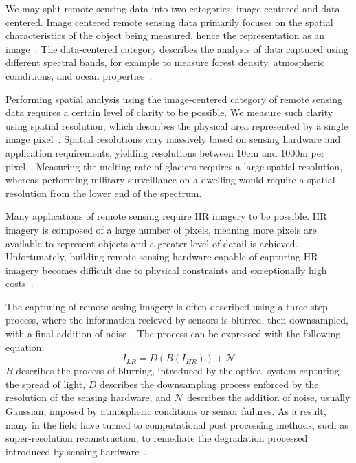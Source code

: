 We may split remote sensing data into two categories: image-centered and data-centered. Image centered remote sensing data primarily focuses on the spatial characteristics of the object being measured, hence the representation as an image~\cite{remoteSensingImageProcessing}. The data-centered category describes the analysis of data captured using different spectral bands, for example to measure forest density, atmospheric coniditions, and ocean properties~\cite{remoteSensingImageProcessing}.

Performing spatial analysis using the image-centered category of remote sensing data requires a certain level of clarity to be possible. We measure such clarity using spatial resolution, which describes the physical area represented by a single image pixel~\cite{ref}. Spatial resolutions vary massively based on sensing hardware and application requirements, yielding resolutions between 10cm and 1000m per pixel~\cite{remoteSensing,remoteSensingImageProcessing}. Measuring the melting rate of glaciers requires a large spatial resolution, whereas performing military surveillance on a dwelling would require a spatial resolution from the lower end of the spectrum.

Many applications of remote sensing require HR imagery to be possible. HR imagery is composed of a large number of pixels, meaning more pixels are available to represent objects and a greater level of detail is achieved. Unfortunately, building remote sensing hardware capable of capturing HR imagery becomes difficult due to physical constraints and exceptionally high costs~\cite{ref}. 

The capturing of remote sesing imagery is often described using a three step process, where the information recieved by sensors is blurred, then downsampled, with a final addition of noise~\cite{superResRemoteSensingOverview, superResRemoteSensingChallenges, remoteSensingDeepLearningReview, remoteSensingGANsReview}. The process can be expressed with the following equation:
\[I_{LR} = D(B(I_{HR})) + \mathcal{N}\]
$B$ describes the process of blurring, introduced by the optical system capturing the spread of light, $D$ describes the downsampling process enforced by the resolution of the sensing hardware, and $\mathcal{N}$ describes the addition of noise, usually Gaussian, imposed by atmospheric conditions or sensor failures. As a result, many in the field have turned to computational post processing methods, such as super-resolution reconstruction, to remediate the degradation processed introduced by sensing hardware~\cite{superResRemoteSensingOverview}. 


